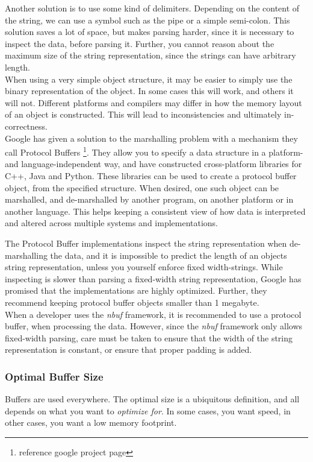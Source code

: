 \documentclass[a4paper]{article}
\newcommand{\nbuf}{\textit{nbuf} }
\begin{document}
Another solution is to use some kind of delimiters. Depending on the content of the string, we can use a symbol such as the pipe or a simple semi-colon. This solution saves a lot of space, but makes parsing harder, since it is necessary to inspect the data, before parsing it. Further, you cannot reason about the maximum size of the string representation, since the strings can have arbitrary length.\\

When using a very simple object structure, it may be easier to simply use the binary representation of the object. In some cases this will work, and others it will not. Different platforms and compilers may differ in how the memory layout of an object is constructed. This will lead to inconsistencies and ultimately in-correctness.\\

Google has given a solution to the marshalling problem with a mechanism they call Protocol Buffers \footnote{reference google project page}. They allow you to specify a data structure in a platform- and language-independent way, and have constructed cross-platform libraries for C++, Java and Python. These libraries can be used to create a protocol buffer object, from the specified structure. When desired, one such object can be marshalled, and de-marshalled by another program, on another platform or in another language. This helps keeping a consistent view of how data is interpreted and altered across multiple systems and implementations.

The Protocol Buffer implementations inspect the string representation when de-marshalling the data, and it is impossible to predict the length of an objects string representation, unless you yourself enforce fixed width-strings. While inspecting is slower than parsing a fixed-width string representation, Google has promised that the implementations are highly optimized. Further, they recommend keeping protocol buffer objects smaller than 1 megabyte.\\

When a developer uses the \nbuf framework, it is recommended to use a protocol buffer, when processing the data. However, since the \nbuf framework only allows fixed-width parsing, care must be taken to ensure that the width of the string representation is constant, or ensure that proper padding is added.


\subsubsection{Optimal Buffer Size}
Buffers are used everywhere. The optimal size is a ubiquitous definition, and all depends on what you want to \textit{optimize for}. In some cases, you want speed, in other cases, you want a low memory footprint.\\
\end{document}
